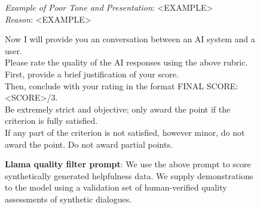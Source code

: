\begin{figure}
\begin{framed}
\begin{itemize}
    \emph{Example of Poor Tone and Presentation}: <EXAMPLE>\\
    \emph{Reason}: <EXAMPLE>
\end{itemize} 

Now I will provide you an conversation between an AI system and a user. \\

Please rate the quality of the AI responses using the above rubric. \\

First, provide a brief justification of your score. \\

Then, conclude with your rating in the format FINAL SCORE: <SCORE>/3. \\

Be extremely strict and objective; only award the point if the criterion is fully satisfied. \\

If any part of the criterion is not satisfied, however minor, do not award the point. Do not award partial points.

\end{framed}

  \caption{\textbf{Llama quality filter prompt}: We use the above prompt to score synthetically generated helpfulness data. We supply demonstrations to the model using a validation set of human-verified quality assessments of synthetic dialogues.}
  \label{fig:llama_quality_prompt}
\end{figure}



